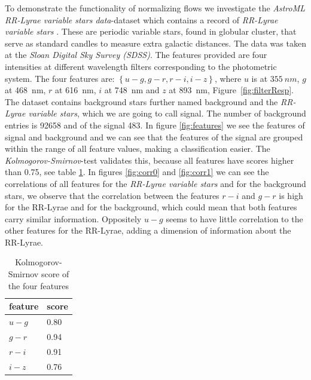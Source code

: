 \documentclass[%
 reprint,
 amsmath,amssymb,
 aps,
]{revtex4-2}
\begin{document}
To demonstrate the functionality of normalizing flows we investigate the \textit{AstroML RR-Lyrae variable stars data}-dataset \cite{astroML} which contains a record of \textit{RR-Lyrae variable stars} \cite{Sesar_2009}. These are periodic variable stars, found in globular cluster, that serve as standard candles to measure extra galactic distances. The data was taken at the \textit{Sloan Digital Sky Survey (SDSS)}.
 The features provided are four intensities at different wavelength filters corresponding to the photometric system. The four features are: $\left\{u-g, g-r, r-i, i-z\right\}$, where $u$ is at $\SI{355}{nm}$, $g$ at \SI{468}{nm}, $r$ at \SI{616}{nm}, $i$ at \SI{748}{nm} and $z$ at \SI{893}{nm}, Figure~\ref{fig:filterResp}. The dataset contains background stars further named background and the \textit{RR-Lyrae variable stars}, which we are going to call signal. The number of background entries is \SI{92658}{} and of the signal \SI{483}{}.
 In figure \ref{fig:features} we see the features of signal and background and we can see that the features of the signal are grouped within the range of all feature values, making a classification easier. The \textit{Kolmogorov-Smirnov}-test validates this, because all features have scores higher than 0.75, see table \ref{tab:kolmogorov}. In figures \ref{fig:corr0} and \ref{fig:corr1} we can see the correlations of all features for the \textit{RR-Lyrae variable stars} and for the background stars, we observe that the correlation between the features $r-i$ and $g-r$ is high for the RR-Lyrae and for the background, which could mean that both features carry similar information. Oppositely $u-g$ seems to have little correlation to the other features for the RR-Lyrae, adding a dimension of information about the RR-Lyrae.
 
 
 
 \begin{table}
 	\centering
 	\begin{tabular}{|l|l|}
 		\hline
		feature & score\\
		\hline
		$u-g$& 0.80\\
		$g-r$& 0.94\\
		$r-i$& 0.91\\
		$i-z$& 0.76\\
		\hline
 	\end{tabular}
 	\caption{Kolmogorov-Smirnov score of the four features \label{tab:kolmogorov}}
 \end{table}
 
\end{document}
